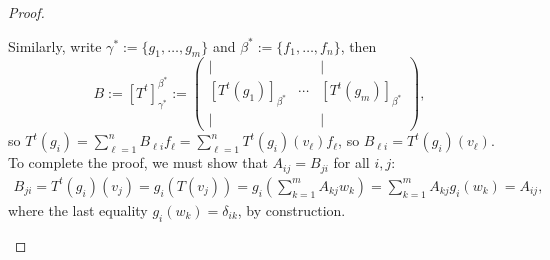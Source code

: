 \begin{proof}
\begin{enumerate}
        Similarly, write $\gamma^\ast := \{g_1, \dots, g_m\}$ and $\beta^\ast:= \{f_1, \dots, f_n\}$, then $$B := [T^t]_{\gamma^\ast}^{\beta^\ast} := \begin{pmatrix}
            \vert & & \vert\\
            [T^t(g_1)]_{\beta^\ast} & \cdots & [T^t(g_m)]_{\beta^\ast}\\ 
            \vert & & \vert
        \end{pmatrix},$$
        so $T^t(g_i) = \sum_{\ell=1}^{n} B_{\ell i} f_\ell= \sum_{\ell=1}^n T^t(g_i)(v_\ell)f_\ell$, so $B_{\ell i} = T^t(g_i)(v_\ell)$. To complete the proof, we must show that $A_{ij} = B_{ji}$ for all $i,j$:
        \begin{align*}
            B_{ji} = T^t(g_i)(v_j) = g_i(T(v_j)) = g_i(\sum_{k=1}^m A_{kj} w_k) = \sum_{k=1}^m A_{kj} g_i(w_k) = A_{ij},
        \end{align*}
        where the last equality $g_i(w_k) = \delta_{ik}$, by construction.
    \end{enumerate}
\end{proof}


